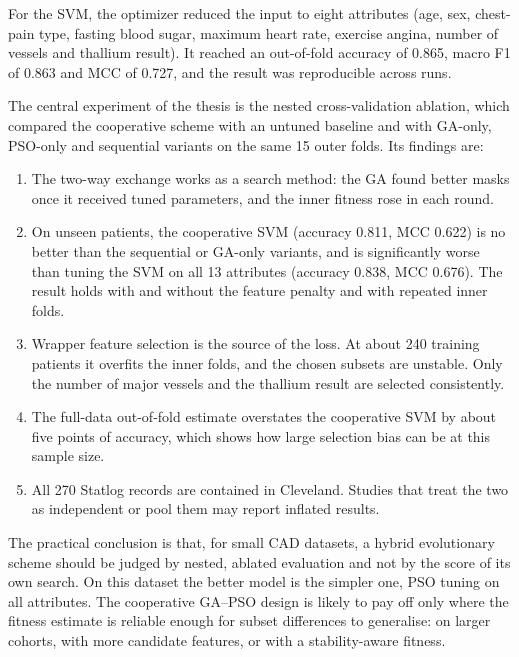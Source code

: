 \documentclass[MTech]{ugthesis}
\begin{document}
For the SVM, the optimizer reduced the input to eight attributes (age, sex, chest-pain type, fasting blood sugar, maximum heart rate, exercise angina, number of vessels and thallium result). It reached an out-of-fold accuracy of 0.865, macro F1 of 0.863 and MCC of 0.727, and the result was reproducible across runs.

The central experiment of the thesis is the nested cross-validation ablation, which compared the cooperative scheme with an untuned baseline and with GA-only, PSO-only and sequential variants on the same 15 outer folds. Its findings are:
\begin{enumerate}
\item The two-way exchange works as a search method: the GA found better masks once it received tuned parameters, and the inner fitness rose in each round.
\item On unseen patients, the cooperative SVM (accuracy 0.811, MCC 0.622) is no better than the sequential or GA-only variants, and is significantly worse than tuning the SVM on all 13 attributes (accuracy 0.838, MCC 0.676). The result holds with and without the feature penalty and with repeated inner folds.
\item Wrapper feature selection is the source of the loss. At about 240 training patients it overfits the inner folds, and the chosen subsets are unstable. Only the number of major vessels and the thallium result are selected consistently.
\item The full-data out-of-fold estimate overstates the cooperative SVM by about five points of accuracy, which shows how large selection bias can be at this sample size.
\item All 270 Statlog records are contained in Cleveland. Studies that treat the two as independent or pool them may report inflated results.
\end{enumerate}
The practical conclusion is that, for small CAD datasets, a hybrid evolutionary scheme should be judged by nested, ablated evaluation and not by the score of its own search. On this dataset the better model is the simpler one, PSO tuning on all attributes. The cooperative GA--PSO design is likely to pay off only where the fitness estimate is reliable enough for subset differences to generalise: on larger cohorts, with more candidate features, or with a stability-aware fitness.
\end{document}
